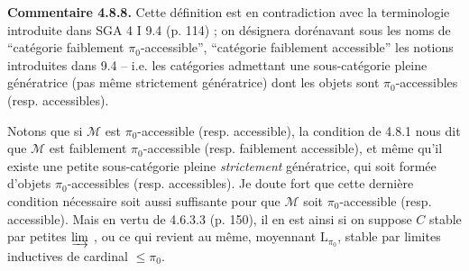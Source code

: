 \documentclass[11pt]{article}
\newcommand{\printedpage}[1]{\marginpar{\footnotesize p.~#1}}
\begin{document}
\textbf{Commentaire 4.8.8.} Cette définition est en contradiction avec la terminologie introduite dans SGA 4 I 9.4 (p. 114) ; on désignera dorénavant sous les noms de ``catégorie faiblement $\pi_0$-accessible'', ``catégorie faiblement accessible'' les notions introduites dans 9.4 -- i.e. les catégories admettant une sous-catégorie pleine génératrice (pas même strictement génératrice) dont les objets sont $\pi_0$-accessibles (resp. accessibles).

Notons que si $\mathcal{M}$ est $\pi_0$-accessible (resp. accessible), la condition de 4.8.1 nous dit que $\mathcal{M}$ est faiblement $\pi_0$-accessible (resp. faiblement accessible), et même qu'il existe une petite sous-catégorie pleine \textit{strictement} génératrice, qui soit formée d'objets $\pi_0$-accessibles (resp. accessibles). Je doute fort que cette dernière condition nécessaire soit aussi suffisante pour
\printedpage{73}
que $\mathcal{M}$ soit $\pi_0$-accessible (resp. accessible). Mais en vertu de 4.6.3.3 (p. 150), il en est ainsi si on suppose $C$ stable par petites $\varinjlim$ , ou ce qui revient au même, moyennant $\mathrm{L}_{\pi_0}$, stable par limites inductives de cardinal $\leqslant\pi_0$.
\end{document}

